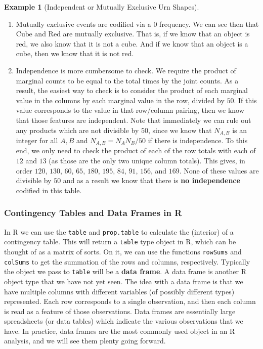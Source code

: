 \documentclass[
  letterpaper,
  DIV=11,
  numbers=noendperiod]{scrreprt}
\theoremstyle{definition}
\theoremstyle{definition}
\newtheorem{example}{Example}[chapter]
\theoremstyle{definition}
\theoremstyle{remark}
\begin{document}
\begin{example}[Independent or Mutually Exclusive Urn
Shapes]
\begin{tcolorbox}[enhanced jigsaw, colback=white, colframe=quarto-callout-color-frame, arc=.35mm, leftrule=.75mm, rightrule=.15mm, opacityback=0, breakable, bottomrule=.15mm, left=2mm, toprule=.15mm]
\begin{enumerate}
\def\labelenumi{\alph{enumi}.}
\item
  Mutually exclusive events are codified via a \(0\) frequency. We can
  see then that \(\text{Cube}\) and \(\text{Red}\) are mutually
  exclusive. That is, if we know that an object is red, we also know
  that it is not a cube. And if we know that an object is a cube, then
  we know that it is not red.
\item
  Independence is more cumbersome to check. We require the product of
  marginal counts to be equal to the total times by the joint counts. As
  a result, the easiest way to check is to consider the product of each
  marginal value in the columns by each marginal value in the row,
  divided by \(50\). If this value corresponds to the value in that
  row/column pairing, then we know that those features are independent.
  Note that immediately we can rule out any products which are not
  divisible by \(50\), since we know that \(N_{A,B}\) is an integer for
  all \(A,B\) and \(N_{A,B} = N_AN_B/50\) if there is independence. To
  this end, we only need to check the product of each of the row totals
  with each of \(12\) and \(13\) (as those are the only two unique
  column totals). This gives, in order \(120\), \(130\), \(60\), \(65\),
  \(180\), \(195\), \(84\), \(91\), \(156\), and \(169\). None of these
  values are divisible by \(50\) and as a result we know that there is
  \textbf{no independence} codified in this table.
\end{enumerate}

\end{tcolorbox}

\end{example}

\subsubsection{Contingency Tables and Data Frames in
R}\label{contingency-tables-and-data-frames-in-r}

In R we can use the \texttt{table} and \texttt{prop.table} to calculate
the (interior) of a contingency table. This will return a \texttt{table}
type object in R, which can be thought of as a matrix of sorts. On it,
we can use the functions \texttt{rowSums} and \texttt{colSums} to get
the summation of the rows and columns, respectively. Typically the
object we pass to \texttt{table} will be a \textbf{data frame}. A data
frame is another R object type that we have not yet seen. The idea with
a data frame is that we have multiple columns with different variables
(of possibly different types) represented. Each row corresponds to a
single observation, and then each column is read as a feature of those
observations. Data frames are essentially large spreadsheets (or data
tables) which indicate the various observations that we have. In
practice, data frames are the most commonly used object in an R
analysis, and we will see them plenty going forward.
\end{document}
